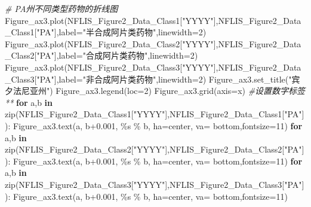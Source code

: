 \documentclass[
]{article}
\newenvironment{Shaded}{}{}
\newcommand{\BuiltInTok}[1]{#1}
\newcommand{\CommentTok}[1]{\textcolor[rgb]{0.38,0.63,0.69}{\textit{#1}}}
\newcommand{\ControlFlowTok}[1]{\textcolor[rgb]{0.00,0.44,0.13}{\textbf{#1}}}
\newcommand{\DecValTok}[1]{\textcolor[rgb]{0.25,0.63,0.44}{#1}}
\newcommand{\FloatTok}[1]{\textcolor[rgb]{0.25,0.63,0.44}{#1}}
\newcommand{\KeywordTok}[1]{\textcolor[rgb]{0.00,0.44,0.13}{\textbf{#1}}}
\newcommand{\NormalTok}[1]{#1}
\newcommand{\OperatorTok}[1]{\textcolor[rgb]{0.40,0.40,0.40}{#1}}
\newcommand{\SpecialCharTok}[1]{\textcolor[rgb]{0.25,0.44,0.63}{#1}}
\newcommand{\StringTok}[1]{\textcolor[rgb]{0.25,0.44,0.63}{#1}}
\begin{document}
\begin{Shaded}
\begin{Highlighting}[]
\CommentTok{\# PA州不同类型药物的折线图}
\NormalTok{Figure\_ax3.plot(NFLIS\_Figure2\_Data\_Class1[}\StringTok{"YYYY"}\NormalTok{],NFLIS\_Figure2\_Data\_Class1[}\StringTok{"PA"}\NormalTok{],label}\OperatorTok{=}\StringTok{"半合成阿片类药物"}\NormalTok{,linewidth}\OperatorTok{=}\DecValTok{2}\NormalTok{)}
\NormalTok{Figure\_ax3.plot(NFLIS\_Figure2\_Data\_Class2[}\StringTok{"YYYY"}\NormalTok{],NFLIS\_Figure2\_Data\_Class2[}\StringTok{"PA"}\NormalTok{],label}\OperatorTok{=}\StringTok{"合成阿片类药物"}\NormalTok{,linewidth}\OperatorTok{=}\DecValTok{2}\NormalTok{)}
\NormalTok{Figure\_ax3.plot(NFLIS\_Figure2\_Data\_Class3[}\StringTok{"YYYY"}\NormalTok{],NFLIS\_Figure2\_Data\_Class3[}\StringTok{"PA"}\NormalTok{],label}\OperatorTok{=}\StringTok{"非合成阿片类药物"}\NormalTok{,linewidth}\OperatorTok{=}\DecValTok{2}\NormalTok{)}
\NormalTok{Figure\_ax3.set\_title(}\StringTok{"宾夕法尼亚州"}\NormalTok{)}
\NormalTok{Figure\_ax3.legend(loc}\OperatorTok{=}\DecValTok{2}\NormalTok{)}
\NormalTok{Figure\_ax3.grid(axis}\OperatorTok{=}\StringTok{\textquotesingle{}x\textquotesingle{}}\NormalTok{)}
 \CommentTok{\#设置数字标签**}
\ControlFlowTok{for}\NormalTok{ a,b }\KeywordTok{in} \BuiltInTok{zip}\NormalTok{(NFLIS\_Figure2\_Data\_Class1[}\StringTok{"YYYY"}\NormalTok{],NFLIS\_Figure2\_Data\_Class1[}\StringTok{"PA"}\NormalTok{]):}
\NormalTok{    Figure\_ax3.text(a, b}\OperatorTok{+}\FloatTok{0.001}\NormalTok{, }\StringTok{\textquotesingle{}}\SpecialCharTok{\%s}\StringTok{\textquotesingle{}} \OperatorTok{\%}\NormalTok{ b, ha}\OperatorTok{=}\StringTok{\textquotesingle{}center\textquotesingle{}}\NormalTok{, va}\OperatorTok{=} \StringTok{\textquotesingle{}bottom\textquotesingle{}}\NormalTok{,fontsize}\OperatorTok{=}\DecValTok{11}\NormalTok{)}
\ControlFlowTok{for}\NormalTok{ a,b }\KeywordTok{in} \BuiltInTok{zip}\NormalTok{(NFLIS\_Figure2\_Data\_Class2[}\StringTok{"YYYY"}\NormalTok{],NFLIS\_Figure2\_Data\_Class2[}\StringTok{"PA"}\NormalTok{]):}
\NormalTok{    Figure\_ax3.text(a, b}\OperatorTok{+}\FloatTok{0.001}\NormalTok{, }\StringTok{\textquotesingle{}}\SpecialCharTok{\%s}\StringTok{\textquotesingle{}} \OperatorTok{\%}\NormalTok{ b, ha}\OperatorTok{=}\StringTok{\textquotesingle{}center\textquotesingle{}}\NormalTok{, va}\OperatorTok{=} \StringTok{\textquotesingle{}bottom\textquotesingle{}}\NormalTok{,fontsize}\OperatorTok{=}\DecValTok{11}\NormalTok{)}
\ControlFlowTok{for}\NormalTok{ a,b }\KeywordTok{in} \BuiltInTok{zip}\NormalTok{(NFLIS\_Figure2\_Data\_Class3[}\StringTok{"YYYY"}\NormalTok{],NFLIS\_Figure2\_Data\_Class3[}\StringTok{"PA"}\NormalTok{]):}
\NormalTok{    Figure\_ax3.text(a, b}\OperatorTok{+}\FloatTok{0.001}\NormalTok{, }\StringTok{\textquotesingle{}}\SpecialCharTok{\%s}\StringTok{\textquotesingle{}} \OperatorTok{\%}\NormalTok{ b, ha}\OperatorTok{=}\StringTok{\textquotesingle{}center\textquotesingle{}}\NormalTok{, va}\OperatorTok{=} \StringTok{\textquotesingle{}bottom\textquotesingle{}}\NormalTok{,fontsize}\OperatorTok{=}\DecValTok{11}\NormalTok{)}
    

\end{Highlighting}
\end{Shaded}
\end{document}
